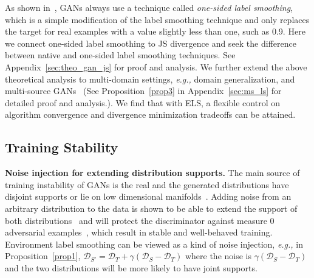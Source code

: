 \documentclass{article} \usepackage{iclr2023_conference,times}
\newcommand{\ls}[0]{ELS\xspace}
\newcommand{\eg}[0]{\textit{e.g., }}
\newcommand{\D}{\mathcal{D}}
\begin{document}
As shown in~\citep{goodfellow2016nips}, GANs always use a technique called \textit{one-sided label smoothing}, which is a simple modification of the label smoothing technique and only replaces the target for real examples with a value slightly less than one, such as 0.9. Here we connect one-sided label smoothing to JS divergence and seek the difference between native and one-sided label smoothing techniques. See Appendix~\ref{sec:theo_gan_js} for proof and analysis. We further extend the above theoretical analysis to multi-domain settings, \eg domain generalization, and multi-source GANs~\citep{trung2019learning} (See Proposition~\ref{prop3} in Appendix~\ref{sec:ms_ls} for detailed proof and analysis.). We find that with \ls, a flexible control on algorithm convergence and divergence minimization tradeoffs can be attained.

\vspace{-0.1cm}
\subsection{Training Stability}\label{sec:stable}
\vspace{-0.1cm}

\textbf{Noise injection for extending distribution supports.} The main source of training instability of GANs is the real and the generated distributions have disjoint supports or lie on low dimensional manifolds~\citep{arjovsky2017towards,roth2017stabilizing}. Adding noise from an arbitrary distribution to the data is shown to be able to extend the support of both distributions~\citep{jenni2019stabilizing,arjovsky2017towards,sonderby2016amortised} and will protect the discriminator against measure 0 adversarial examples~\citep{jenni2019stabilizing}, which result in stable and well-behaved training. Environment label smoothing can be viewed as a kind of noise injection, \eg in Proposition~\ref{prop1}, $\D_{S'}=\D_T+\gamma(\D_S-\D_T)$ where the noise is $\gamma(\D_S-\D_T)$ and the two distributions will be more likely to have joint supports. 
\end{document}
